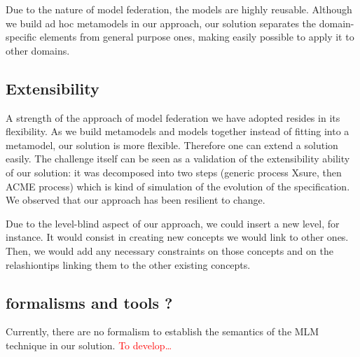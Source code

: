   Due to the nature of model federation, the models are highly reusable.
  Although we build ad hoc metamodels in our approach, our solution separates
  the domain-specific elements from general purpose ones, making easily
  possible to apply it to other domains. 

  \subsection{Extensibility}


  A strength of the approach of model federation we have adopted resides in its
  flexibility. As we build metamodels and models together instead of fitting
  into a metamodel, our solution is more flexible. Therefore one can extend a
  solution easily. The challenge itself can be seen as a validation of the
  extensibility ability of our solution: it was decomposed into two steps
  (generic process Xsure, then ACME process) which is kind of simulation of the
  evolution of the  specification. We observed that our approach has been
  resilient to change.

  Due to the level-blind aspect of our approach, we could insert a new level,
  for instance. It would consist in creating new concepts we would link to
  other ones. Then, we would add any necessary constraints on those concepts
  and on the relashiontips linking them to the other existing concepts. 


  
\subsection{formalisms and tools ?}



Currently, there are no formalism to establish the semantics of the MLM
technique in our solution. \textcolor{red}{To develop…}

